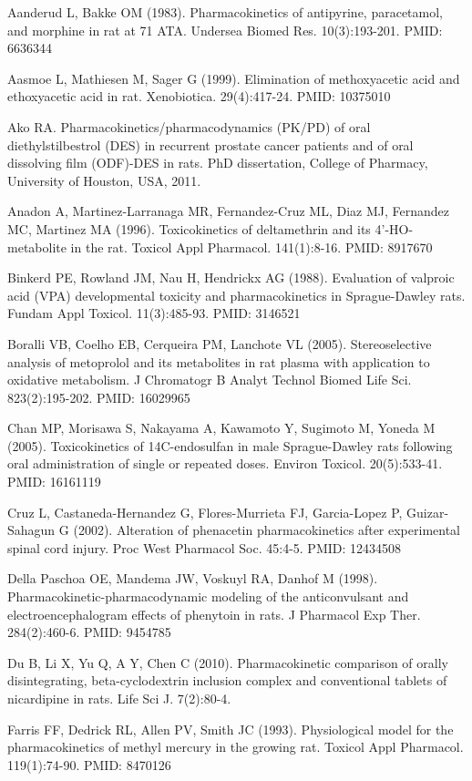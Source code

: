 \documentclass[a4paper]{book}
\begin{document}
\begin{References}\relax
Aanderud L, Bakke OM (1983). Pharmacokinetics of antipyrine,
paracetamol, and morphine in rat at 71 ATA. Undersea Biomed Res.
10(3):193-201. PMID: 6636344

Aasmoe L, Mathiesen M, Sager G (1999). Elimination of methoxyacetic acid and
ethoxyacetic acid in rat. Xenobiotica. 29(4):417-24. PMID: 10375010

Ako RA. Pharmacokinetics/pharmacodynamics (PK/PD) of oral diethylstilbestrol
(DES) in recurrent prostate cancer patients and of oral dissolving film
(ODF)-DES in rats. PhD dissertation, College of Pharmacy, University of
Houston, USA, 2011.

Anadon A, Martinez-Larranaga MR, Fernandez-Cruz ML, Diaz MJ, Fernandez MC,
Martinez MA (1996). Toxicokinetics of deltamethrin and its 4'-HO-metabolite
in the rat. Toxicol Appl Pharmacol. 141(1):8-16. PMID: 8917670

Binkerd PE, Rowland JM, Nau H, Hendrickx AG (1988). Evaluation of valproic
acid (VPA) developmental toxicity and pharmacokinetics in Sprague-Dawley
rats. Fundam Appl Toxicol. 11(3):485-93. PMID: 3146521

Boralli VB, Coelho EB, Cerqueira PM, Lanchote VL (2005). Stereoselective
analysis of metoprolol and its metabolites in rat plasma with application to
oxidative metabolism. J Chromatogr B Analyt Technol Biomed Life Sci.
823(2):195-202. PMID: 16029965

Chan MP, Morisawa S, Nakayama A, Kawamoto Y, Sugimoto M, Yoneda M (2005).
Toxicokinetics of 14C-endosulfan in male Sprague-Dawley rats following oral
administration of single or repeated doses. Environ Toxicol. 20(5):533-41.
PMID: 16161119

Cruz L, Castaneda-Hernandez G, Flores-Murrieta FJ, Garcia-Lopez P,
Guizar-Sahagun G (2002). Alteration of phenacetin pharmacokinetics after
experimental spinal cord injury. Proc West Pharmacol Soc. 45:4-5. PMID:
12434508

Della Paschoa OE, Mandema JW, Voskuyl RA, Danhof M (1998).
Pharmacokinetic-pharmacodynamic modeling of the anticonvulsant and
electroencephalogram effects of phenytoin in rats. J Pharmacol Exp Ther.
284(2):460-6. PMID: 9454785

Du B, Li X, Yu Q, A Y, Chen C (2010). Pharmacokinetic comparison of orally
disintegrating, beta-cyclodextrin inclusion complex and conventional tablets
of nicardipine in rats. Life Sci J. 7(2):80-4.

Farris FF, Dedrick RL, Allen PV, Smith JC (1993). Physiological model for
the pharmacokinetics of methyl mercury in the growing rat. Toxicol Appl
Pharmacol. 119(1):74-90. PMID: 8470126


\end{References}
\end{document}
